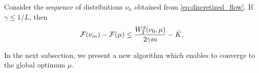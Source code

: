 \begin{theorem}\label{th:rates_mmd}
	Consider the sequence of distributions $\nu_n$ obtained from \cref{eq:discretized_flow}. If $\gamma \leq 1/L$, then
\begin{align}
{{\mathcal F}}(\nu_m)-{{\mathcal F}}(\mu)\leq  \frac{W_2^2(\nu_0,\mu)}{2 \gamma m} -\bar{K}.
\end{align}
\end{theorem}

In the next subsection, we present a new algorithm which enables to converge to the global optimum $\mu$.
